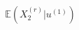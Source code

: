 \documentclass[preview]{standalone}
\begin{document}
\begin{align*}
\mathbb{E}(X^{(r)}_2|u^{(1)})
\end{align*}
\end{document}
